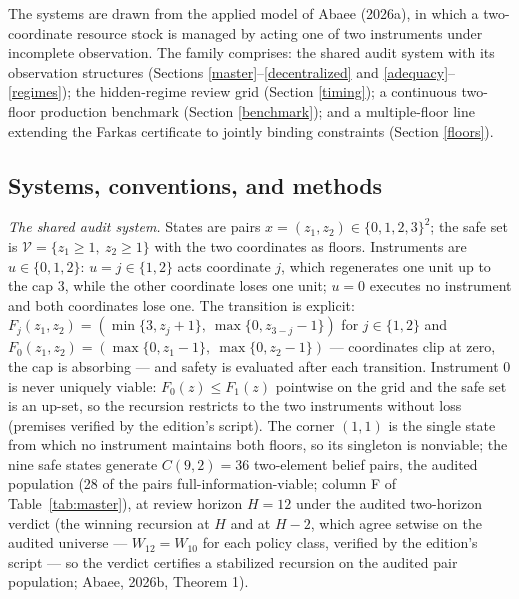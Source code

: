 \documentclass[10pt,twocolumn]{article}
\theoremstyle{definition}
\begin{document}
The systems are drawn from the applied model of Abaee (2026a), in which
a two-coordinate resource stock is managed by acting one of two
instruments under incomplete observation. The family comprises: the
shared audit system with its observation structures (Sections
\ref{master}--\ref{decentralized} and \ref{adequacy}--\ref{regimes});
the hidden-regime review grid (Section
\ref{timing}); a continuous two-floor production benchmark (Section
\ref{benchmark}); and a multiple-floor line extending the Farkas
certificate to jointly binding constraints (Section \ref{floors}).

\subsection{Systems, conventions, and methods}\label{frame}

\emph{The shared audit system.} States are pairs
\(x = (z_1, z_2) \in \{0,1,2,3\}^{2}\); the safe set is
\(\mathcal{V} = \{z_1 \ge 1,\ z_2 \ge 1\}\) with the two coordinates as
floors. Instruments are \(u \in \{0, 1, 2\}\): \(u = j \in \{1,2\}\)
acts coordinate \(j\), which regenerates one unit up to the cap \(3\),
while the other coordinate loses one unit; \(u = 0\) executes no
instrument and both coordinates lose one. The transition is explicit: \(F_j(z_1, z_2) = (\min\{3, z_j + 1\},\ \max\{0, z_{3-j} - 1\})\) for \(j \in \{1,2\}\) and \(F_0(z_1, z_2) = (\max\{0, z_1 - 1\},\ \max\{0, z_2 - 1\})\) --- coordinates clip at zero, the cap is absorbing --- and safety is evaluated after each transition. Instrument \(0\) is never uniquely viable: \(F_0(z) \le F_1(z)\) pointwise on the grid and the safe set is an up-set, so the recursion restricts to the two instruments without loss (premises verified by the edition's script). The corner \((1,1)\) is the
single state from which no instrument maintains both floors, so its
singleton is nonviable; the nine safe states generate
\(C(9,2) = 36\) two-element belief pairs, the audited population (28 of the pairs full-information-viable; column F of Table~\ref{tab:master}), at review horizon \(H = 12\) under the audited two-horizon verdict (the winning recursion at \(H\) and at \(H - 2\), which agree setwise on the audited universe --- \(W_{12} = W_{10}\) for each policy class, verified by the edition's script --- so the verdict certifies a stabilized recursion on the audited pair population; Abaee, 2026b, Theorem 1).
\end{document}
